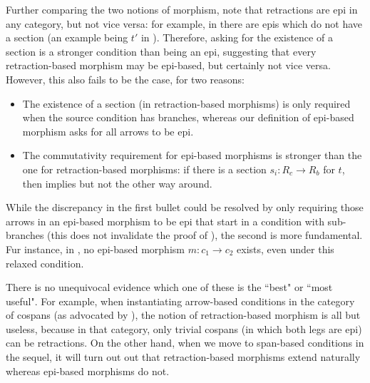 %
Further comparing the two notions of morphism, note that retractions are epi in any category, but not vice versa: for example, in  there are epis which do not have a section (an example being $t'$ in ). Therefore, asking for the existence of a section is a stronger condition than being an epi, suggesting that every retraction-based morphism may be epi-based, but certainly not vice versa. However, this also fails to be the case, for two reasons:
%
\begin{itemize}
\item The existence of a section (in retraction-based morphisms) is only required when the source condition has branches, whereas our definition of epi-based morphism asks for all arrows to be epi.
\item The commutativity requirement for epi-based morphisms is stronger than the one for retraction-based morphisms: if there is a section $s_i: R_c \to R_b$ for $t$, then  implies  but not the other way around.
\end{itemize}
%
While the discrepancy in the first bullet could be resolved by only requiring those arrows in an epi-based morphism to be epi that start in a condition with sub-branches (this does not invalidate the proof of ), the second is more fundamental. Fur instance, in , no epi-based morphism $m:c_1\to c_2$ exists, even under this relaxed condition.

There is no unequivocal evidence which one of these is the ``best" or ``most useful". For example, when instantiating arrow-based conditions in the category of cospans (as advocated by \cite{bchk:conditional-reactive-systems}), the notion of retraction-based morphism is all but useless, because in that category, only trivial cospans (in which both legs are epi) can be retractions. On the other hand, when we move to span-based conditions in the sequel, it will turn out out that retraction-based morphisms extend naturally whereas epi-based morphisms do not.